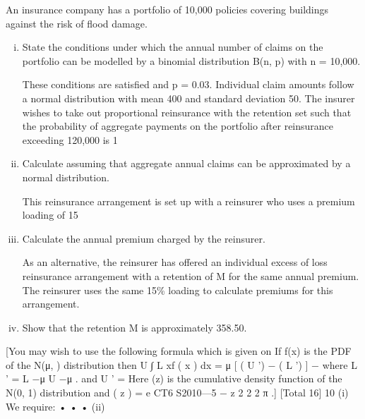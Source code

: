 \documentclass[a4paper,12pt]{article}
\begin{document}
 
\item 
An insurance company has a portfolio of 10,000 policies covering buildings against the risk of flood damage.
\begin{enumerate}[(i)]
\item State the conditions under which the annual number of claims on the portfolio can be modelled by a binomial distribution B(n, p) with n = 10,000.

These conditions are satisfied and p = 0.03. Individual claim amounts follow a normal distribution with mean 400 and standard deviation 50. The insurer wishes to take out proportional reinsurance with the retention \alpha set such that the probability of
aggregate payments on the portfolio after reinsurance exceeding 120,000 is 1%
\item %
Calculate \alpha assuming that aggregate annual claims can be approximated by a
normal distribution.

This reinsurance arrangement is set up with a reinsurer who uses a premium loading
of 15%
\item %
Calculate the annual premium charged by the reinsurer.

As an alternative, the reinsurer has offered an individual excess of loss reinsurance
arrangement with a retention of M for the same annual premium. The reinsurer uses
the same 15\% loading to calculate premiums for this arrangement.
\item %
Show that the retention M is approximately 358.50.
\end{enumerate}
[You may wish to use the following formula which is given on %
If f(x) is the PDF of the N(μ,  ) distribution then
U
∫ L
xf ( x ) dx = μ [ \phi  ( U ') − \phi  ( L ') ] − 
where L ' =
L −μ
U −μ
.
and U ' =
\sigma
\sigma
Here \phi (z) is the cumulative density function of the N(0, 1) distribution and
\phi  ( z ) =
e
CT6 S2010—5
−
z 2
2
2 π
.]
[Total 16]
\new%
10
(i)
We require:
•
•
•
(ii)
\end{document}
